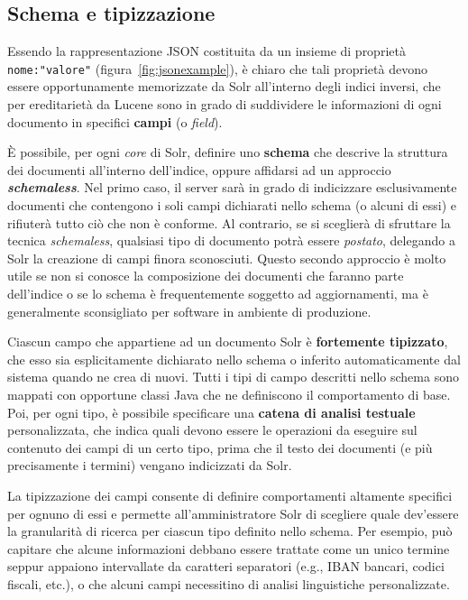 \subsection{Schema e tipizzazione}

Essendo la rappresentazione JSON costituita da un insieme di proprietà \texttt{nome:"valore"} (figura~\ref{fig:jsonexample}), è chiaro che tali proprietà devono essere opportunamente memorizzate da Solr all’interno degli indici inversi, che per ereditarietà da Lucene sono in grado di suddividere le informazioni di ogni documento in specifici \textbf{campi} (o \textit{field}).

È possibile, per ogni \textit{core} di Solr, definire uno \textbf{schema} che descrive la struttura dei documenti all’interno dell’indice, oppure affidarsi ad un approccio \textbf{\textit{schemaless}}. Nel primo caso, il server sarà in grado di indicizzare esclusivamente documenti che contengono i soli campi dichiarati nello schema (o alcuni di essi) e rifiuterà tutto ciò che non è conforme. Al contrario, se si sceglierà di sfruttare la tecnica \textit{schemaless}, qualsiasi tipo di documento potrà essere \textit{postato}, delegando a Solr la creazione di campi finora sconosciuti. Questo secondo approccio è molto utile se non si conosce la composizione dei documenti che faranno parte dell’indice o se lo schema è frequentemente soggetto ad aggiornamenti, ma è generalmente sconsigliato per software in ambiente di produzione.

\vspace{1em}

Ciascun campo che appartiene ad un documento Solr è \textbf{fortemente tipizzato}, che esso sia esplicitamente dichiarato nello schema o inferito automaticamente dal sistema quando ne crea di nuovi. Tutti i tipi di campo descritti nello schema sono mappati con opportune classi Java che ne definiscono il comportamento di base. Poi, per ogni tipo, è possibile specificare una \textbf{catena di analisi testuale} personalizzata, che indica quali devono essere le operazioni da eseguire sul contenuto dei campi di un certo tipo, prima che il testo dei documenti (e più precisamente i termini) vengano indicizzati da Solr.

La tipizzazione dei campi consente di definire comportamenti altamente specifici per ognuno di essi e permette all’amministratore Solr di scegliere quale dev’essere la granularità di ricerca per ciascun tipo definito nello schema. Per esempio, può capitare che alcune informazioni debbano essere trattate come un unico termine seppur appaiono intervallate da caratteri separatori (e.g., IBAN bancari, codici fiscali, etc.), o che alcuni campi necessitino di analisi linguistiche personalizzate.

